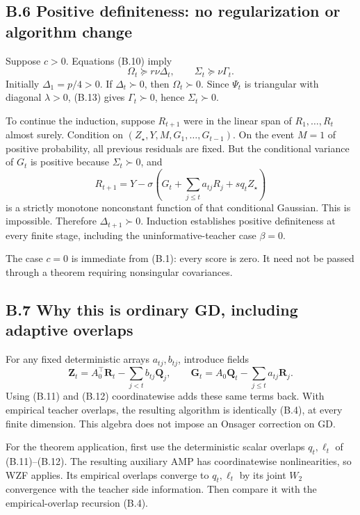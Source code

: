\documentclass[
  11pt,
  a4paper,
]{article}
\begin{document}
\hypertarget{b.6-positive-definiteness-no-regularization-or-algorithm-change}{%
\subsection{B.6 Positive definiteness: no regularization or algorithm
change}\label{b.6-positive-definiteness-no-regularization-or-algorithm-change}}

Suppose \(c>0\). Equations (B.10) imply \[
\Omega_t\succeq r\nu\Delta_t,\qquad \Sigma_t\succeq\nu\Gamma_t.
\tag{B.19}
\] Initially \(\Delta_1=p/4>0\). If \(\Delta_t\succ0\), then
\(\Omega_t\succ0\). Since \(\Psi_t\) is triangular with diagonal
\(\lambda>0\), (B.13) gives \(\Gamma_t\succ0\), hence
\(\Sigma_t\succ0\).

To continue the induction, suppose \(R_{t+1}\) were in the linear span
of \(R_1,\ldots,R_t\) almost surely. Condition on
\((Z_\star,Y,M,G_1,\ldots,G_{t-1})\). On the event \(M=1\) of positive
probability, all previous residuals are fixed. But the conditional
variance of \(G_t\) is positive because \(\Sigma_t\succ0\), and \[
R_{t+1}=Y-\sigma\left(G_t+\sum_{j\le t}a_{tj}R_j+s q_tZ_\star\right)
\] is a strictly monotone nonconstant function of that conditional
Gaussian. This is impossible. Therefore \(\Delta_{t+1}\succ0\).
Induction establishes positive definiteness at every finite stage,
including the uninformative-teacher case \(\beta=0\).

The case \(c=0\) is immediate from (B.1): every score is zero. It need
not be passed through a theorem requiring nonsingular covariances.

\hypertarget{b.7-why-this-is-ordinary-gd-including-adaptive-overlaps}{%
\subsection{B.7 Why this is ordinary GD, including adaptive
overlaps}\label{b.7-why-this-is-ordinary-gd-including-adaptive-overlaps}}

For any fixed deterministic arrays \(a_{tj},b_{tj}\), introduce fields
\[
\mathbf Z_t=A_0^\top\mathbf R_t-\sum_{j<t}b_{tj}\mathbf Q_j,
\qquad
\mathbf G_t=A_0\mathbf Q_t-\sum_{j\le t}a_{tj}\mathbf R_j.
\] Using (B.11) and (B.12) coordinatewise adds these same terms back.
With empirical teacher overlaps, the resulting algorithm is identically
(B.4), at every finite dimension. This algebra does not impose an
Onsager correction on GD.

For the theorem application, first use the deterministic scalar overlaps
\(q_t,\ell_t\) of (B.11)--(B.12). The resulting auxiliary AMP has
coordinatewise nonlinearities, so WZF applies. Its empirical overlaps
converge to \(q_t,\ell_t\) by its joint \(W_2\) convergence with the
teacher side information. Then compare it with the empirical-overlap
recursion (B.4).
\end{document}
